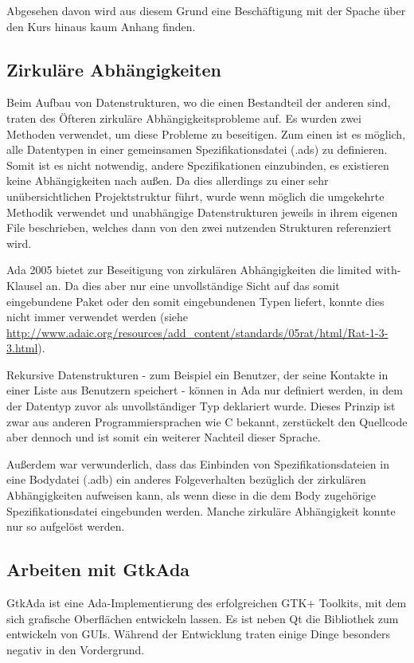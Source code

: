 \documentclass[12pt,a4paper,bibliography=totocnumbered,listof=totocnumbered]{scrartcl}
\begin{document}
Abgesehen davon wird aus diesem Grund eine Beschäftigung mit der Spache über den Kurs hinaus kaum Anhang finden.

\subsection{Zirkuläre Abhängigkeiten}
Beim Aufbau von Datenstrukturen, wo die einen Bestandteil der anderen sind, traten des Öfteren zirkuläre Abhängigkeitsprobleme auf. Es wurden zwei Methoden verwendet, um diese Probleme zu beseitigen. Zum einen ist es möglich, alle Datentypen in einer gemeinsamen Spezifikationsdatei (.ads) zu definieren. Somit ist es nicht notwendig, andere Spezifikationen einzubinden, es existieren keine Abhängigkeiten nach außen. Da dies allerdings zu einer sehr unübersichtlichen Projektstruktur führt, wurde wenn möglich die umgekehrte Methodik verwendet und unabhängige Datenstrukturen jeweils in ihrem eigenen File beschrieben, welches dann von den zwei nutzenden Strukturen referenziert wird.

Ada 2005 bietet zur Beseitigung von zirkulären Abhängigkeiten die \glqq{}limited with\grqq{}-Klausel an. Da dies aber nur eine unvollständige Sicht auf das somit eingebundene Paket oder den somit eingebundenen Typen liefert, konnte dies nicht immer verwendet werden (siehe \url{http://www.adaic.org/resources/add_content/standards/05rat/html/Rat-1-3-3.html}).


Rekursive Datenstrukturen - zum Beispiel ein Benutzer, der seine Kontakte in einer Liste aus Benutzern speichert - können in Ada nur definiert werden, in dem der Datentyp zuvor als unvollständiger Typ deklariert wurde. Dieses Prinzip ist zwar aus anderen Programmiersprachen wie C bekannt, zerstückelt den Quellcode aber dennoch und ist somit ein weiterer Nachteil dieser Sprache.


Außerdem war verwunderlich, dass das Einbinden von Spezifikationsdateien in eine Bodydatei (.adb) ein anderes Folgeverhalten bezüglich der zirkulären Abhängigkeiten aufweisen kann, als wenn diese in die dem Body zugehörige Spezifikationsdatei eingebunden werden. Manche zirkuläre Abhängigkeit konnte nur so aufgelöst werden.

\subsection{Arbeiten mit GtkAda}
GtkAda ist eine Ada-Implementierung des erfolgreichen GTK+ Toolkits, mit dem sich grafische Oberflächen entwickeln lassen. Es ist neben Qt die Bibliothek zum entwickeln von GUIs. Während der Entwicklung traten einige Dinge besonders negativ in den Vordergrund.
\end{document}
